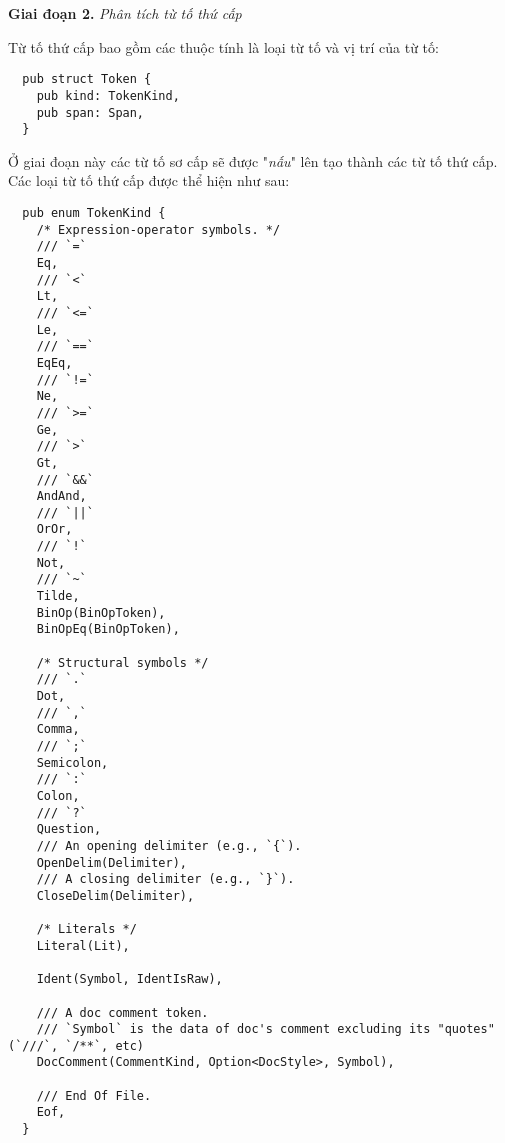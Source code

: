 \textbf{Giai đoạn 2.} \textit{Phân tích từ tố thứ cấp}

Từ tố thứ cấp bao gồm các thuộc tính là loại từ tố và vị trí của từ tố:
\begin{lstlisting}
  pub struct Token {
    pub kind: TokenKind,
    pub span: Span,
  }
\end{lstlisting}

Ở giai đoạn này các từ tố sơ cấp sẽ được "\textit{nấu}" lên tạo thành các từ tố thứ cấp. Các loại từ tố thứ cấp được thể hiện như sau:
\begin{lstlisting}
  pub enum TokenKind {
    /* Expression-operator symbols. */
    /// `=`
    Eq,
    /// `<`
    Lt,
    /// `<=`
    Le,
    /// `==`
    EqEq,
    /// `!=`
    Ne,
    /// `>=`
    Ge,
    /// `>`
    Gt,
    /// `&&`
    AndAnd,
    /// `||`
    OrOr,
    /// `!`
    Not,
    /// `~`
    Tilde,
    BinOp(BinOpToken),
    BinOpEq(BinOpToken),

    /* Structural symbols */
    /// `.`
    Dot,
    /// `,`
    Comma,
    /// `;`
    Semicolon,
    /// `:`
    Colon,
    /// `?`
    Question,
    /// An opening delimiter (e.g., `{`).
    OpenDelim(Delimiter),
    /// A closing delimiter (e.g., `}`).
    CloseDelim(Delimiter),

    /* Literals */
    Literal(Lit),

    Ident(Symbol, IdentIsRaw),

    /// A doc comment token.
    /// `Symbol` is the data of doc's comment excluding its "quotes" (`///`, `/**`, etc)
    DocComment(CommentKind, Option<DocStyle>, Symbol),

    /// End Of File.
    Eof,
  }
\end{lstlisting} 

